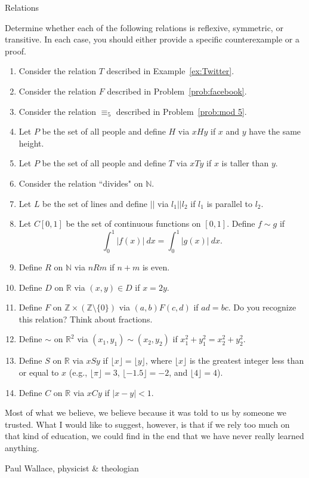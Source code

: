 \begin{section}{Relations}
\begin{problem}\label{prob:lots of relations}
Determine whether each of the following relations is reflexive, symmetric, or transitive. In each case, you should either provide a specific counterexample or a proof.
\begin{enumerate}[label=\textrm{(\alph*)}]
\item Consider the relation $T$ described in Example~\ref{ex:Twitter}.
\item Consider the relation $F$ described in Problem~\ref{prob:facebook}.
\item Consider the relation $\equiv_5$ described in Problem~\ref{prob:mod 5}.
\item Let $P$ be the set of all people and define $H$ via $xHy$ if $x$ and $y$ have the same height.
\item Let $P$ be the set of all people and define $T$ via $xTy$ if $x$ is taller than $y$.
\item Consider the relation ``divides" on $\mathbb{N}$.
\item Let $L$ be the set of lines and define $||$ via $l_1||l_2$ if $l_1$ is parallel to $l_2$.
\item Let $C[0,1]$ be the set of continuous functions on $[0,1]$.  Define $f\sim g$ if
\[
\int_0^1|f(x)|\ dx=\int_0^1|g(x)|\ dx.
\]
\item Define $R$ on $\mathbb{N}$ via $nR m$ if $n+m$ is even.
\item Define $D$ on $\mathbb{R}$ via $(x,y)\in D$ if $x=2y$.
\item Define $F$ on $\mathbb{Z}\times \left(\mathbb{Z}\setminus \{0\}\right)$ via $(a,b)F(c,d)$ if $ad=bc$. Do you recognize this relation? Think about fractions.
\item Define $\sim$ on $\mathbb{R}^2$ via $(x_1,y_1)\sim (x_2,y_2)$ if $x_1^2+y_1^2=x_2^2+y_2^2$.
\item Define $S$ on $\mathbb{R}$ via $xS y$ if $\lfloor x\rfloor =\lfloor y\rfloor$, where $\lfloor x\rfloor$ is the greatest integer less than or equal to $x$ (e.g., $\lfloor \pi\rfloor=3$, $\lfloor -1.5\rfloor=-2$, and $\lfloor 4\rfloor=4$).
\item Define $C$ on $\mathbb{R}$ via $xCy$ if $|x-y|<1$.
\end{enumerate}
\end{problem}

\begingroup
\setlength{\epigraphwidth}{0.4\textwidth}
\epigraph{Most of what we believe, we believe because it was told to us by someone we trusted. What I would like to suggest, however, is that if we rely too much on that kind of education, we could find in the end that we have never really learned anything.}{Paul Wallace, physicist \& theologian}
\endgroup
\end{section}